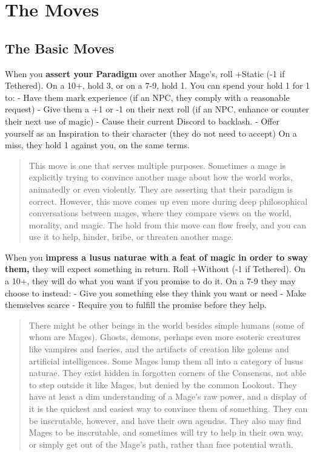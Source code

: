 \documentclass[
  oneside,
  statementpaper,
  9pt]{memoir}
\begin{document}
\newpage

\setlength{\parindent}{1em}

\hypertarget{the-moves}{%
\chapter{The Moves}\label{the-moves}}

\hypertarget{the-basic-moves}{%
\section{The Basic Moves}\label{the-basic-moves}}

When you \textbf{assert your Paradigm} over another Mage's, roll +Static
(-1 if Tethered). On a 10+, hold 3, or on a 7-9, hold 1. You can spend
your hold 1 for 1 to: - Have them mark experience (if an NPC, they
comply with a reasonable request) - Give them a +1 or -1 on their next
roll (if an NPC, enhance or counter their next use of magic) - Cause
their current Discord to backlash. - Offer yourself as an Inspiration to
their character (they do not need to accept) On a miss, they hold 1
against you, on the same terms.

\begin{quote}
This move is one that serves multiple purposes. Sometimes a mage is
explicitly trying to convince another mage about how the world works,
animatedly or even violently. They are asserting that their paradigm is
correct. However, this move comes up even more during deep philosophical
conversations between mages, where they compare views on the world,
morality, and magic. The hold from this move can flow freely, and you
can use it to help, hinder, bribe, or threaten another mage.
\end{quote}

When you \textbf{impress a lusus naturae with a feat of magic in order
to sway them,} they will expect something in return. Roll +Without (-1
if Tethered). On a 10+, they will do what you want if you promise to do
it. On a 7-9 they may choose to instead: - Give you something else they
think you want or need - Make themselves scarce - Require you to fulfill
the promise before they help.

\begin{quote}
There might be other beings in the world besides simple humans (some of
whom are Mages). Ghosts, demons, perhaps even more esoteric creatures
like vampires and faeries, and the artifacts of creation like golems and
artificial intelligences. Some Mages lump them all into a category of
lusus naturae. They exist hidden in forgotten corners of the Consensus,
not able to step outside it like Mages, but denied by the common
Lookout. They have at least a dim understanding of a Mage's raw power,
and a display of it is the quickest and easiest way to convince them of
something. They can be inscrutable, however, and have their own agendas.
They also may find Mages to be inscrutable, and sometimes will try to
help in their own way, or simply get out of the Mage's path, rather than
face potential wrath.
\end{quote}
\end{document}
